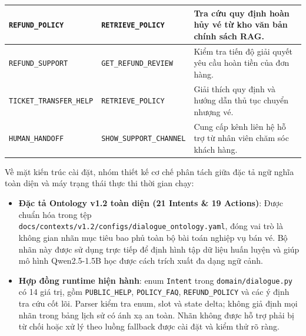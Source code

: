 \begin{longtable}{|L{3.9cm}|L{4.4cm}|p{6.2cm}|}
\hline
\texttt{REFUND\_POLICY} & \texttt{RETRIEVE\_POLICY} & Tra cứu quy định hoàn hủy vé từ kho văn bản chính sách RAG. \\
\hline
\texttt{REFUND\_SUPPORT} & \texttt{GET\_REFUND\_REVIEW} & Kiểm tra tiến độ giải quyết yêu cầu hoàn tiền của đơn hàng. \\
\hline
\texttt{TICKET\_}\allowbreak\texttt{TRANSFER\_}\allowbreak\texttt{HELP} & \texttt{RETRIEVE\_POLICY} & Giải thích quy định và hướng dẫn thủ tục chuyển nhượng vé. \\
\hline
\texttt{HUMAN\_HANDOFF} & \texttt{SHOW\_SUPPORT\_CHANNEL} & Cung cấp kênh liên hệ hỗ trợ từ nhân viên chăm sóc khách hàng. \\
\hline
\end{longtable}
\endgroup

Về mặt kiến trúc cài đặt, nhóm thiết kế cơ chế phân tách giữa đặc tả ngữ nghĩa toàn diện và máy trạng thái thực thi thời gian chạy:
\begin{itemize}[nosep]
  \item \textbf{Đặc tả Ontology v1.2 toàn diện (21 Intents \& 19 Actions)}: Được chuẩn hóa trong tệp \nolinkurl{docs/contexts/v1.2/configs/dialogue_ontology.yaml}, đóng vai trò là không gian nhãn mục tiêu bao phủ toàn bộ bài toán nghiệp vụ bán vé. Bộ nhãn này được sử dụng trực tiếp để định hình tập dữ liệu huấn luyện và giúp mô hình Qwen2.5-1.5B học được cách trích xuất đa dạng ngữ cảnh.
  \item \textbf{Hợp đồng runtime hiện hành}: enum \texttt{Intent} trong \texttt{domain/dialogue.py} có 14 giá trị, gồm \texttt{PUBLIC\_HELP}, \texttt{POLICY\_FAQ}, \texttt{REFUND\_POLICY} và các ý định tra cứu cốt lõi. Parser kiểm tra enum, slot và state delta; không giả định mọi nhãn trong bảng lịch sử có ánh xạ an toàn. Nhãn không được hỗ trợ phải bị từ chối hoặc xử lý theo luồng fallback được cài đặt và kiểm thử rõ ràng.
\end{itemize}
